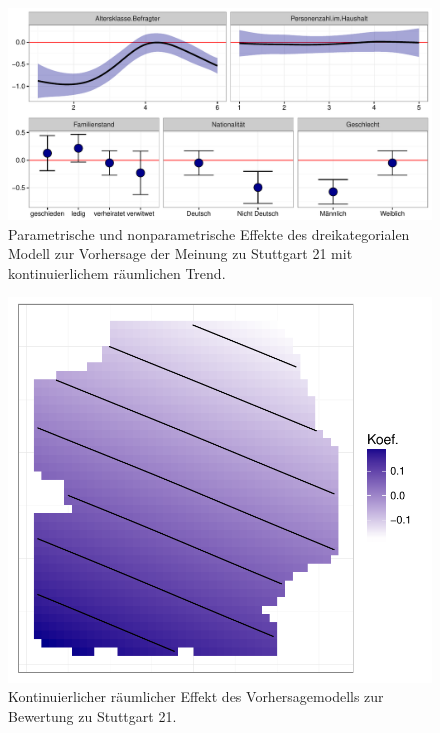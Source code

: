 \documentclass{Vorlage}
\begin{document}
\begin{figure}[h]
 \begin{center}
 \includegraphics[scale=0.8]{Pictures/S21ModelEffects}
 \caption{Parametrische und nonparametrische Effekte des dreikategorialen Modell zur Vorhersage der Meinung zu Stuttgart 21 mit kontinuierlichem räumlichen Trend.}
 \label{GKParam}
 \end{center}
\end{figure}

\begin{figure}[h]
 \begin{center}
 \includegraphics[scale=0.6]{Pictures/S21_3_Kont_SpatEff}
 \caption{Kontinuierlicher räumlicher Effekt des Vorhersagemodells zur Bewertung zu Stuttgart 21.}
 \label{S21_3_Kont_SpatEff}
 \end{center}
\end{figure}
\end{document}
